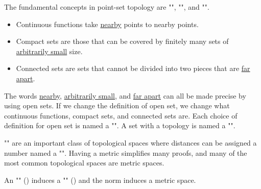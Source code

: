 The fundamental concepts in point-set topology are "", "", and "".
	\begin{itemize}
		\item Continuous functions take \underline{nearby} points to nearby points.
		
		\item Compact\label{compact} sets are those that can be covered by finitely many sets of \underline{arbitrarily small} size. 
		
		\item Connected sets are sets that cannot be divided into two pieces that are \underline{far apart}. 
	\end{itemize}		
	The words \underline{nearby}, \underline{arbitrarily small}, and \underline{far apart} can all be made precise by using open sets. If we change the definition of open set, we change what continuous functions, compact sets, and connected sets are. Each choice of definition for open set is named a "". A set with a topology is named a "\label{topological space}".

	"\label{metric space}" are an important class of topological spaces where distances can be assigned a number named a "\label{metric}". Having a metric simplifies many proofs, and many of the most common topological spaces are metric spaces.
	
	An "" () induces a "" () and the norm induces a metric space. 
	
